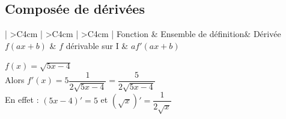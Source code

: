 \subsection{Composée de dérivées}
\begin{center}
    \setlength{\arrayrulewidth}{1pt}
    \renewcommand{\arraystretch}{1.9}
    \begin{tabular}{| >{}C{4cm} | >{}C{4cm} | >{}C{4cm} | }
    	\hline Fonction & Ensemble de définition& Dérivée  \\
    	\hline$f(ax+b)$ & $f$ dérivable sur I & $af'(ax+b)$ \\
    	\hline
    \end{tabular}
\end{center}
\begin{bmethode}
    $f(x)=\sqrt{5x-4}$\\		
    Alors $f'(x)=5\dfrac{1}{2\sqrt{5x-4}}=\dfrac{5}{2\sqrt{5x-4}}$\\  	 
    En effet : $(5x-4)'=5$ et $(\sqrt{x})'= \dfrac{1}{2\sqrt{x}}$\\ 
\end{bmethode}

